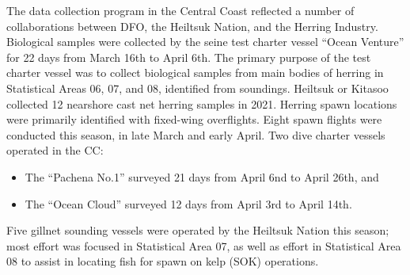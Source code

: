 The data collection program in the Central Coast reflected a number of
collaborations between DFO, the Heiltsuk Nation, and the Herring Industry.
Biological samples were collected by the seine test charter vessel ``Ocean Venture''
for 22 days from March 16th to April 6th.
The primary purpose of the test charter vessel was to collect biological samples
from main bodies of herring in Statistical Areas 06, 07, and 08, identified from soundings.
Heiltsuk or Kitasoo collected 12 nearshore cast net herring samples in 2021.
Herring spawn locations were primarily identified with fixed-wing overflights.
Eight spawn flights were conducted this season, in late March and early April.
Two dive charter vessels operated in the CC:
\begin{itemize}
\item The ``Pachena No.1'' surveyed 21 days from April 6nd to April 26th, and
\item The ``Ocean Cloud'' surveyed 12 days from April 3rd to April 14th.
\end{itemize}
Five gillnet sounding vessels were operated by the Heiltsuk Nation this season;
most effort was focused in Statistical Area 07, as well as
effort in Statistical Area 08 to assist in locating fish
for spawn on kelp (SOK) operations.
